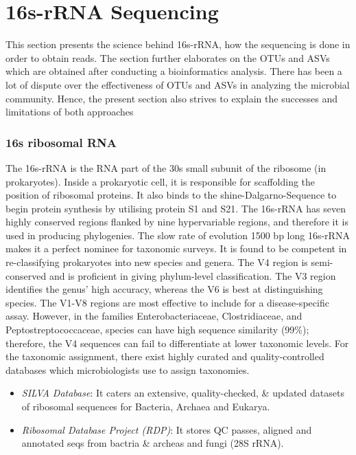 \chapter{16s-rRNA Sequencing}
 \setcounter{page}{9}

This section presents the science behind 16s-rRNA, how the sequencing is done in order to obtain reads. The section further elaborates on the OTUs and ASVs which are obtained after conducting a bioinformatics analysis. There has been a lot of dispute over the effectiveness of OTUs and ASVs in analyzing the microbial community. Hence, the present section also strives to explain the successes and limitations of both approaches

\subsection{16s ribosomal RNA}
The 16s-rRNA is the RNA part of the 30s small subunit of the ribosome (in prokaryotes).  Inside a prokaryotic cell, it is responsible for scaffolding the position of ribosomal proteins. It also binds to the shine-Dalgarno-Sequence to begin protein synthesis by utilising protein S1 and S21. The 16s-rRNA has seven highly conserved regions flanked by nine hypervariable regions, and therefore it is used in producing phylogenies. The slow rate of evolution 1500 bp long 16s-rRNA makes it a perfect nominee for taxonomic surveys. It is found to be competent in re-classifying prokaryotes into new species and genera. The V4 region is semi-conserved and is proficient in giving phylum-level classification. The V3 region identifies the genus' high accuracy, whereas the V6 is best at distinguishing species. The V1-V8 regions are most effective to include for a disease-specific assay. However, in the families Enterobacteriaceae, Clostridiaceae, and Peptostreptococcaceae, species can have high sequence similarity (99\%); therefore, the V4 sequences can fail to differentiate at lower taxonomic levels. For the taxonomic assignment, there exist highly curated and quality-controlled databases which microbiologists use to assign taxonomies.

\begin{itemize}
  \item \textit{SILVA Database}: It caters an extensive, quality-checked, \& updated datasets of ribosomal sequences for Bacteria, Archaea and Eukarya.
  \item \textit{Ribosomal Database Project (RDP)}: It stores QC passes, aligned and annotated seqs from bactria \& archeas and fungi (28S rRNA).
\end{itemize}

